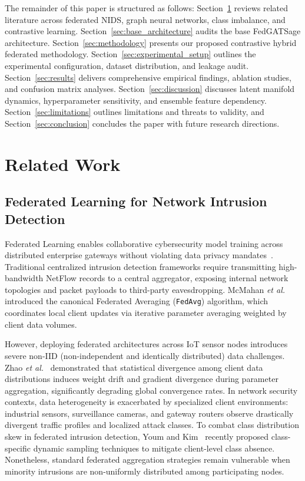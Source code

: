 \documentclass[journal,onecolumn]{IEEEtran}
\begin{document}
The remainder of this paper is structured as follows: Section~\ref{sec:related_work} reviews related literature across federated NIDS, graph neural networks, class imbalance, and contrastive learning. Section~\ref{sec:base_architecture} audits the base FedGATSage architecture. Section~\ref{sec:methodology} presents our proposed contrastive hybrid federated methodology. Section~\ref{sec:experimental_setup} outlines the experimental configuration, dataset distribution, and leakage audit. Section~\ref{sec:results} delivers comprehensive empirical findings, ablation studies, and confusion matrix analyses. Section~\ref{sec:discussion} discusses latent manifold dynamics, hyperparameter sensitivity, and ensemble feature dependency. Section~\ref{sec:limitations} outlines limitations and threats to validity, and Section~\ref{sec:conclusion} concludes the paper with future research directions.

\section{Related Work}
\label{sec:related_work}

\subsection{Federated Learning for Network Intrusion Detection}
Federated Learning enables collaborative cybersecurity model training across distributed enterprise gateways without violating data privacy mandates~\cite{mcmahan2017federated}. Traditional centralized intrusion detection frameworks require transmitting high-bandwidth NetFlow records to a central aggregator, exposing internal network topologies and packet payloads to third-party eavesdropping. McMahan \emph{et al.}~\cite{mcmahan2017federated} introduced the canonical Federated Averaging (\texttt{FedAvg}) algorithm, which coordinates local client updates via iterative parameter averaging weighted by client data volumes.

However, deploying federated architectures across IoT sensor nodes introduces severe non-IID (non-independent and identically distributed) data challenges. Zhao \emph{et al.}~\cite{zhao2018federated} demonstrated that statistical divergence among client data distributions induces weight drift and gradient divergence during parameter aggregation, significantly degrading global convergence rates. In network security contexts, data heterogeneity is exacerbated by specialized client environments: industrial sensors, surveillance cameras, and gateway routers observe drastically divergent traffic profiles and localized attack classes. To combat class distribution skew in federated intrusion detection, Youm and Kim~\cite{youm2025dsfedids} recently proposed class-specific dynamic sampling techniques to mitigate client-level class absence. Nonetheless, standard federated aggregation strategies remain vulnerable when minority intrusions are non-uniformly distributed among participating nodes.
\end{document}
